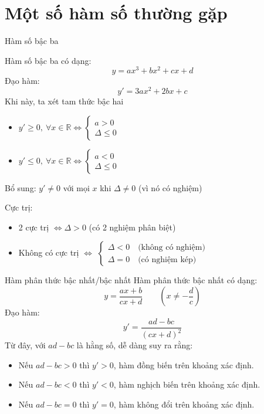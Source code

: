 \section{Một số hàm số thường gặp}
\begin{lythuyetbox}{Hàm số bậc ba}

  Hàm số bậc ba có dạng:
  \[ y = ax^3 + bx^2 + cx + d \]
  Đạo hàm:
  \[ y' = 3a x^2 + 2b x + c \]
  Khi này, ta xét tam thức bậc hai
  \begin{itemize}
      \item $y' \geq 0,\ \forall x \in \mathbb{R} \Leftrightarrow \begin{cases} a > 0 \\ \Delta \leq 0 \end{cases}$
      \item $y' \leq 0,\ \forall x \in \mathbb{R} \Leftrightarrow \begin{cases} a < 0 \\ \Delta \leq 0 \end{cases}$ 
  \end{itemize}
  Bổ sung: $y' \neq 0$ với mọi $x$ khi $\Delta \neq 0$ (vì nó có nghiệm)

  \vspace{1.5em}
  Cực trị:
  \begin{itemize}
      \item 2 cực trị $\Leftrightarrow \Delta > 0$ (có 2 nghiệm phân biệt)
      \item Không có cực trị $\Leftrightarrow$
      $\left\{\begin{array}{l}
          \Delta < 0 \quad \text{(không có nghiệm)} \\
          \Delta = 0 \quad \text{(có nghiệm kép)}
      \end{array}\right.$
  \end{itemize}

\end{lythuyetbox}

\begin{lythuyetbox}{Hàm phân thức bậc nhất/bậc nhất}
  Hàm phân thức bậc nhất có dạng:
  \[ y = \frac{ax + b}{cx + d} \qquad (x \neq -\frac{d}{c}) \]
  Đạo hàm:
  \[ y' = \frac{ad-bc}{(cx + d)^2} \]
  Từ đây, với $ad - bc$ là hằng số, dễ dàng suy ra rằng:
  \begin{itemize}
      \item Nếu $ad - bc > 0$ thì $y' > 0$, hàm đồng biến trên khoảng xác định.
      \item Nếu $ad - bc < 0$ thì $y' < 0$, hàm nghịch biến trên khoảng xác định.
      \item Nếu $ad - bc = 0$ thì $y' = 0$, hàm không đổi trên khoảng xác định.
  \end{itemize}

\end{lythuyetbox}

